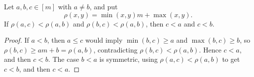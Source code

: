 \begin{lemma}
Let \(a,b,c\in[m]\) with \(a\ne b\), and put
\[
\rho(x,y)=\min(x,y)m+\max(x,y).
\]
If \(\rho(a,c)<\rho(a,b)\) and \(\rho(b,c)<\rho(a,b)\), then
\(c<a\) and \(c<b\).
\end{lemma}
\begin{proof}
If \(a<b\), then \(a\le c\) would imply
\(\min(b,c)\ge a\) and \(\max(b,c)\ge b\), so
\(\rho(b,c)\ge am+b=\rho(a,b)\), contradicting
\(\rho(b,c)<\rho(a,b)\). Hence \(c<a\), and then \(c<b\).
The case \(b<a\) is symmetric, using
\(\rho(a,c)<\rho(a,b)\) to get \(c<b\), and then \(c<a\).
\end{proof}
